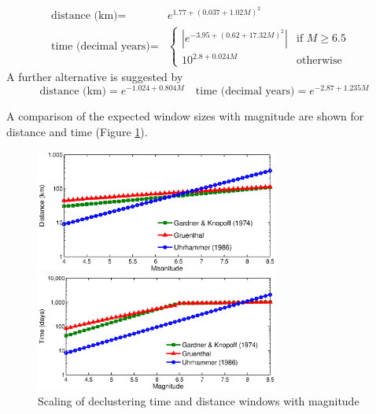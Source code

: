 \begin{equation}\begin{split} 
\mbox{distance (km)} = & e^{1.77 + \left( {0.037 + 1.02 M} \right)^2} \\ 
   \mbox{time (decimal years)} = & \begin{cases}   |e^{-3.95+ \left( {0.62 + 17.32 M}
    \right)^2}|    & \text{if $M \geq 6.5$ } \\ 10^{2.8 + 0.024 M} & 
    \text{otherwise}  \end{cases}\end{split}
\end{equation}
A further alternative is suggested by \cite{Uhrhammer1986}
%
\begin{equation}
\mbox{distance (km)} = e^{-1.024 + 0.804 M} \quad \mbox{time (decimal years)} = 
    e^{-2.87 + 1.235 M}
\end{equation}

A comparison of the expected window sizes with magnitude are shown for 
distance  and time (Figure \ref{fig:declust_scaling}).

\begin{figure}[htb]
  \centering
  \begin{subcaption}
      \centering
      \includegraphics[width=8cm]{./figures/declustering_distance_windows.eps}
	\end{subcaption}
  \begin{subcaption}
      \centering
      \includegraphics[width=8cm]{./figures/declustering_time_windows.eps}
	\end{subcaption}	
	\caption{Scaling of declustering time and distance windows with magnitude}
	\label{fig:declust_scaling}
\end{figure}

